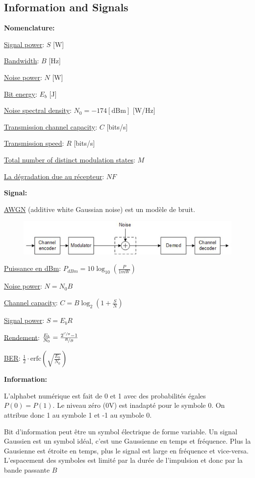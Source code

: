 \subsection*{Information and Signals}
\textbf{Nomenclature:}

\underline{Signal power}: $S$ [W]

\underline{Bandwidth}: $B$ [Hz]

\underline{Noise power}: $N$ [W]

\underline{Bit energy}: $E_b$ [J]

\underline{Noise spectral density}: $N_0=-174[\text{dBm}]$ [W/Hz]

\underline{Transmission channel capacity}: $C$ [bits/s]

\underline{Transmission speed}: $R$ [bits/s]

\underline{Total number of distinct modulation states}: $M$

\underline{La dégradation due au récepteur}: $NF$

\textbf{Signal:}

\underline{AWGN} (additive white Gaussian noise) est un modèle de bruit.
\begin{figure}[H]
    \includegraphics[width=\linewidth]{images/awgn_channel_model.png}
\end{figure}
\underline{Puissance en dBm}: $P_{dBm} = 10\log_{10}\left(\frac{P}{1mW}\right)$

\underline{Noise power}: $N = N_0B$

\underline{Channel capacity}: $C = B\log_2\left(1+\frac{S}{N}\right)$

\underline{Signal power}: $S = E_bR$

\underline{Rendement}: $\frac{E_b}{N_0}=\frac{2^{\sfrac{C}{B}}-1}{\sfrac{R}{B}}$

\underline{BER}: $\frac{1}{2}\cdot\text{erfc}\left(\sqrt{\frac{E_b}{N_0}}\right)$

\textbf{Information:}

L'alphabet numérique est fait de 0 et 1 avec des probabilités
égales $P(0) = P(1)$. Le niveau zéro (0V) est inadapté pour le symbole 0. On attribue
donc 1 au symbole 1 et -1 au symbole 0.

Bit d'information peut être un symbol électrique de forme variable.
Un signal Gaussien est un symbol idéal, c'est une Gaussienne en temps et fréquence.
Plus la Gausienne est étroite en temps, plus le signal est large en fréquence et
vice-versa. L'espacement des symboles est limité par la durée de l'impulsion et
donc par la bande passante $B$


